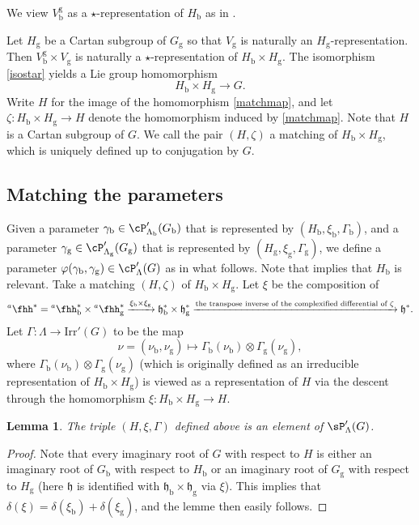 \documentclass[12pt]{amsart}
\newcommand{\h}{\mathfrak h}
\newcommand{\be}{\begin {equation}}
\newcommand{\ee}{\end {equation}}
\numberwithin{equation}{section}
\newtheorem{lem}[thm]{Lemma}
\theoremstyle{remark}
\def\Irr{\mathrm{Irr}}
\def\hha{{}^a\fhh}
\begin{document}
We view  $V_\mathrm b^\mathrm g$  as a $\star$-representation of  $H_\mathrm b$ as in .



  Let $H_\mathrm g$ be a Cartan subgroup of $G_\mathrm g$ so that $V_\mathrm g$ is naturally an $H_\mathrm g$-representation.
Then $V_\mathrm b^\mathrm g\times V_\mathrm g$ is naturally a $\star$-representation of $H_\mathrm b\times H_\mathrm g$. The isomorphism \eqref{isostar} yields a Lie group homomorphism
\be\label{matchmap}
H_\mathrm b\times H_\mathrm g\rightarrow G.
\ee
Write $H$ for the image of the homomorphism \eqref{matchmap}, and let $\zeta: H_\mathrm b\times H_\mathrm g\rightarrow H$ denote the homomorphism induced by \eqref{matchmap}.
Note that $H$ is a Cartan subgroup of $G$. We call the pair $(H, \zeta)$ a matching of $H_\mathrm b\times H_\mathrm g$, which is uniquely defined up to conjugation by $G$.


\subsection{Matching the parameters}
Given a parameter $\gamma_\mathrm b \in\cP'_{\Lambda_\mathrm b}(G_\mathrm b)$ that is represented by
$(H_\mathrm b, \xi_\mathrm b, \Gamma_\mathrm b)$,
and  a parameter $\gamma_\mathrm g \in\cP'_{\Lambda_\mathrm g}(G_\mathrm g)$
that is represented by $(H_\mathrm g, \xi_\mathrm g, \Gamma_\mathrm g)$,
we  define  a parameter $\varphi(\gamma_\mathrm b,  \gamma_\mathrm g) \in\cP'_{\Lambda}(G)$
as in what follows.
Note that  implies that $H_\mathrm b$ is  relevant.
Take a matching $(H, \zeta)$ of $H_\mathrm b\times H_\mathrm g$.
Let $\xi$ be the composition of
\[
    \hha^*=\hha_\mathrm b^*\times  \hha_\mathrm g^*\xrightarrow{\xi_\mathrm b\times \xi_\mathrm g} \h_\mathrm b^*\times \h_\mathrm g^*\xrightarrow{\textrm{the transpose inverse of the complexified differential of $\zeta$}} \h^*.
\]
Let $\Gamma: \Lambda\rightarrow \Irr'(G)$ to be the map
\[
  \nu=(\nu_\mathrm b, \nu_\mathrm g)\mapsto \Gamma_\mathrm b(\nu_\mathrm b)\otimes \Gamma_\mathrm g(\nu_\mathrm g),
\]
where  $\Gamma_\mathrm b(\nu_\mathrm b)\otimes \Gamma_\mathrm g(\nu_\mathrm g)$
(which is originally defined as an irreducible representation of $H_\mathrm b\times H_\mathrm g$)
is viewed as a representation of $H$ via the descent through the homomorphism
$\xi: H_\mathrm b\times H_\mathrm g\rightarrow H$.




\begin{lem}
The triple $(H, \xi, \Gamma)$ defined above is an element of $\sP'_{\Lambda}(G)$.
\end{lem}
\begin{proof}
Note that
every imaginary root of $G$ with respect to $H$ is either an  imaginary root of $G_\mathrm b$ with respect to $H_\mathrm b$ or an  imaginary root of $G_\mathrm g$ with respect to $H_\mathrm g$ (here $\h$ is identified with $\h_\mathrm b\times \h_\mathrm g$ via $\xi$). This  implies that $\delta(\xi)=\delta(\xi_\mathrm b)+\delta(\xi_\mathrm g)$, and the lemme then easily follows.
\end{proof}
\end{document}
